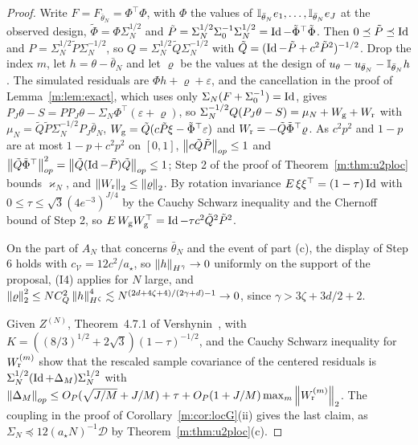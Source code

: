 \begin{proof}
Write $F=F_{\bar\theta_N}=\Phi^\top\Phi$, with $\Phi$ the values of $\mathbb{I}_{\bar\theta_N}e_1,\dots,\mathbb{I}_{\bar\theta_N}e_J$ at the observed design, $\tilde\Phi=\Phi\Sigma_N^{1/2}$ and $\tilde P=\Sigma_N^{1/2}\Sigma_0^{-1}\Sigma_N^{1/2}=\operatorname{Id}-\tilde\Phi^\top\tilde\Phi$. Then $0\preceq\tilde P\preceq\operatorname{Id}$ and $P=\Sigma_N^{1/2}\tilde P\Sigma_N^{-1/2}$, so $Q=\Sigma_N^{1/2}\tilde Q\Sigma_N^{-1/2}$ with $\tilde Q=(\operatorname{Id}-\tilde P+c^2\tilde P^2)^{-1/2}$. Drop the index $m$, let $h=\theta-\bar\theta_N$ and let $\varrho$ be the values at the design of $u_\theta-u_{\bar\theta_N}-\mathbb{I}_{\bar\theta_N}h$. The simulated residuals are $\Phi h+\varrho+\varepsilon$, and the cancellation in the proof of Lemma~\ref{m:lem:exact}, which uses only $\Sigma_N(F+\Sigma_0^{-1})=\operatorname{Id}$, gives $P_J\theta-S=PP_J\theta-\Sigma_N\Phi^\top(\varepsilon+\varrho)$, so $\Sigma_N^{-1/2}Q(P_J\theta-S)=\mu_N+W_{\rm g}+W_{\rm r}$ with $\mu_N=\tilde Q\tilde P\Sigma_N^{-1/2}P_J\bar\theta_N$, $W_{\rm g}=\tilde Q(c\tilde P\xi-\tilde\Phi^\top\varepsilon)$ and $W_{\rm r}=-\tilde Q\tilde\Phi^\top\varrho$. As $c^2p^2$ and $1-p$ are at most $1-p+c^2p^2$ on $[0,1]$, $\left\|c\tilde Q\tilde P\right\|_{op}\le1$ and $\left\|\tilde Q\tilde\Phi^\top\right\|^2_{op}=\left\|\tilde Q(\operatorname{Id}-\tilde P)\tilde Q\right\|_{op}\le1$; Step 2 of the proof of Theorem~\ref{m:thm:u2ploc} bounds $\varkappa_N$, and $\left\|W_{\rm r}\right\|_2\le\left\|\varrho\right\|_2$. By rotation invariance $E\,\xi\xi^\top=(1-\tau)\operatorname{Id}$ with $0\le\tau\le\sqrt3(4e^{-3})^{J/4}$ by the Cauchy Schwarz inequality and the Chernoff bound of Step 2, so $E\,W_{\rm g}W_{\rm g}^\top=\operatorname{Id}-\tau c^2\tilde Q^2\tilde P^2$.

On the part of $A_N$ that concerns $\bar\theta_N$ and the event of part (c), the display of Step 6 holds with $c_{\mathcal V}=12c^2/a_\star$, so $\left\|h\right\|_{H^{\bar\gamma}}\to0$ uniformly on the support of the proposal, (I4) applies for $N$ large, and $\left\|\varrho\right\|^2_2\le NC_Q^2\left\|h\right\|^4_{H^\zeta}\lesssim N^{(2d+4\zeta+4)/(2\gamma+d)-1}\to0$, since $\gamma>3\zeta+3d/2+2$.

Given $Z^{(N)}$, Theorem~4.7.1 of Vershynin~\cite{vershynin2018}, with $K=((8/3)^{1/2}+2\sqrt3)(1-\tau)^{-1/2}$, and the Cauchy Schwarz inequality for $W^{(m)}_{\rm r}$ show that the rescaled sample covariance of the centered residuals is $\Sigma_N^{1/2}(\operatorname{Id}+\Delta_M)\Sigma_N^{1/2}$ with $\left\|\Delta_M\right\|_{op}\le O_P(\sqrt{J/M}+J/M)+\tau+O_P(1+J/M)\max_m\left\|W^{(m)}_{\rm r}\right\|_2$. The coupling in the proof of Corollary~\ref{m:cor:locG}(ii) gives the last claim, as $\Sigma_N\preceq12(a_\star N)^{-1}\mathcal D$ by Theorem~\ref{m:thm:u2ploc}(c).
\end{proof}
